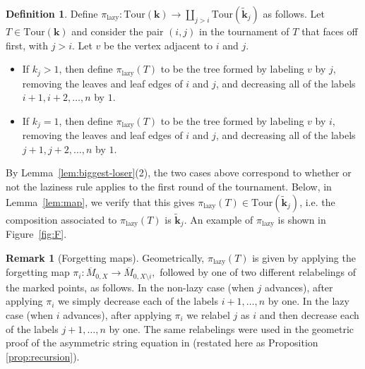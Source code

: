 \documentclass[11pt]{amsart}
\newcommand{\Mbar}{\overline{M}}
\newcommand{\Tour}{\mathrm{Tour}}
\newcommand{\forget}{\pi_{\mathrm{lazy}}}
\numberwithin{thm}{section}
\numberwithin{equation}{section}
\numberwithin{figure}{section}
\theoremstyle{definition}
\newtheorem{definition}[thm]{Definition}
\newtheorem{remark}[thm]{Remark}
\begin{document}
\begin{definition}
  Define $\forget:\Tour(\mathbf{k})\to \coprod_{j>i} \Tour(\widetilde{\mathbf{k}}_j)$ as follows.  Let $T\in \Tour(\mathbf{k})$ and consider the pair $(i,j)$ in the tournament of $T$ that faces off first, with $j>i$. Let $v$ be the vertex adjacent to $i$ and $j$.
  \begin{itemize}
      \item If $k_j>1$, then define $\forget(T)$ to be the tree formed by labeling $v$ by $j$, removing the leaves and leaf edges of $i$ and $j$, and decreasing all of the labels $i+1,i+2,\ldots,n$ by $1$. 

      \item If $k_j=1$, then define $\forget(T)$ to be the tree formed by labeling $v$ by $i$, removing the leaves and leaf edges of $i$ and $j$, and decreasing all of the labels $j+1,j+2,\ldots,n$ by $1$. 
  \end{itemize}
By Lemma~\ref{lem:biggest-loser}(2), the two cases above correspond to whether or not the laziness rule applies to the first round of the tournament. Below, in Lemma~\ref{lem:map}, we verify that this gives $\forget(T) \in \Tour(\widetilde{\mathbf{k}}_j)$, i.e. the composition associated to $\forget(T)$ is $\widetilde{\mathbf{k}}_j$. An example of $\forget$ is shown in Figure~\ref{fig:F}.
\end{definition}

\begin{remark}[Forgetting maps]\label{rmk:forget-and-forgive}
  Geometrically, $\forget(T)$ is given by applying the forgetting map $\pi_i : \Mbar_{0, X} \to \Mbar_{0, X\setminus i},$ followed by one of two different relabelings of the marked points, as follows. In the non-lazy case (when $j$ advances), after applying $\pi_i$ we simply decrease each of the labels $i+1,\ldots,n$ by one. In the lazy case (when $i$ advances), after applying $\pi_i$ we relabel $j$ as $i$ and then decrease each of the labels $j+1,\ldots,n$ by one. The same relabelings were used in the geometric proof of the asymmetric string equation in \cite{CGM} (restated here as Proposition \ref{prop:recursion}).
  \end{remark}
  
\end{document}
